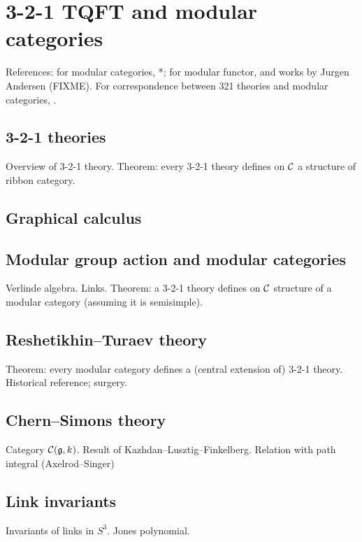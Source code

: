 \chapter{3-2-1 TQFT and modular categories}\label{c:321}

References: for modular categories, *{};
for modular functor,  and works by
Jurgen Andersen (FIXME). For correspondence between 321 theories
and modular categories, .

\section{3-2-1 theories}\label{s:321-theories}
Overview of 3-2-1 theory. Theorem:
every 3-2-1 theory defines on $\mathcal{C}$ a structure of
ribbon category.

\section{Graphical calculus}\label{s:321-graphical}

\section{Modular group action and modular categories}\label{s:modular-group-action}
Verlinde algebra. Links.
Theorem: a 3-2-1 theory defines on $\mathcal{C}$ structure of a modular category
(assuming it is semisimple).

\section{Reshetikhin--Turaev theory}\label{s:rt-theory}
Theorem: every modular category defines a (central extension of) 3-2-1 theory.
Historical reference; surgery.

\section{Chern--Simons theory}\label{s:chern-simons}
Category $\mathcal{C}(\mathfrak{g}, k)$. Result of Kazhdan--Lusztig--Finkelberg. Relation with
path integral (Axelrod--Singer)

\section{Link invariants}\label{s:link-invariants}
Invariants of links in $S^3$. Jones polynomial.